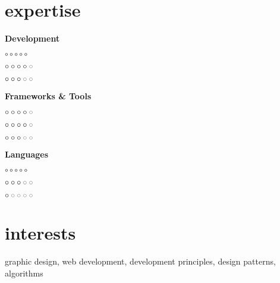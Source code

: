 \documentclass[a4paper]{cv}
\begin{document}
\section{expertise}
\begin{multicols}{3}

	\centerline{\textbf{Development}}
	\begin{description}[style=multiline,leftmargin=1.8cm,font=\normalfont]
		\item[JavaScript] {\huge\color{red}$\circ\circ\circ\circ\circ$}
		\item[HTML5] {\huge\color{red}$\circ\circ\circ\circ\color{gray}\circ$}
		\item[CSS3] {\huge\color{red}$\circ\circ\circ\color{gray}\circ\circ$}
	\end{description}
	\vfill
	\columnbreak

	\centerline{\textbf{Frameworks \& Tools}}
	\begin{description}[style=multiline,leftmargin=1.8cm,font=\normalfont]
		\item[React] {\huge\color{red}$\circ\circ\circ\circ\color{gray}\circ$}
		\item[Redux] {\huge\color{red}$\circ\circ\circ\circ\color{gray}\circ$}
		\item[Vue] {\huge\color{red}$\circ\circ\circ\color{gray}\circ\circ$}
	\end{description}
	\vfill
	\columnbreak

	\centerline{\textbf{Languages}}
	\begin{description}[style=multiline,leftmargin=1.4cm,font=\normalfont]
		\item[Slovak] {\huge\color{red}$\circ\circ\circ\circ\circ$}
		\item[English] {\huge\color{red}$\circ\circ\circ\color{gray}\circ\circ$}
		\item[German] {\huge\color{red}$\circ\color{gray}\circ\circ\circ\circ$}
	\end{description}
	\vfill
	\columnbreak
\end{multicols}


\section{interests}
	graphic design, web development, development principles, design patterns, algorithms

\end{document}
